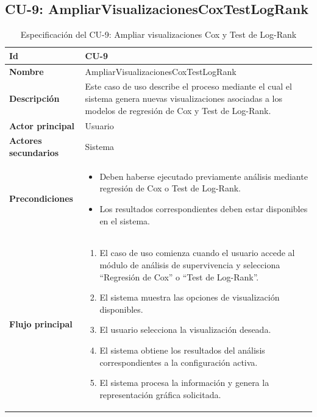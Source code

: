     \subsection{CU-9: AmpliarVisualizacionesCoxTestLogRank}
    \begin{longtable}{|p{4cm}|p{10cm}|}
\caption{Especificación del CU-9: Ampliar visualizaciones Cox y Test de Log-Rank}
\label{tab:esp_cu9}\\
\hline
\textbf{Id} & CU-9 \\ \hline
\textbf{Nombre} & AmpliarVisualizacionesCoxTestLogRank \\ \hline

\textbf{Descripción} & 
Este caso de uso describe el proceso mediante el cual el sistema genera nuevas visualizaciones asociadas a los modelos de regresión de Cox y Test de Log-Rank. \\ \hline

\textbf{Actor principal} & Usuario \\ \hline
\textbf{Actores secundarios} & Sistema \\ \hline

\textbf{Precondiciones} & 
\begin{itemize}
    \item Deben haberse ejecutado previamente análisis mediante regresión de Cox o Test de Log-Rank.
    \item Los resultados correspondientes deben estar disponibles en el sistema.
\end{itemize} \\ \hline

\textbf{Flujo principal} & 
\begin{enumerate}
    \item El caso de uso comienza cuando el usuario accede al módulo de análisis de supervivencia y selecciona ``Regresión de Cox'' o ``Test de Log-Rank''.
    
    \item El sistema muestra las opciones de visualización disponibles.
    
    \item El usuario selecciona la visualización deseada.
    
    \item El sistema obtiene los resultados del análisis correspondientes a la configuración activa.
    
    \item El sistema procesa la información y genera la representación gráfica solicitada.
    

\end{enumerate}
\end{longtable}

